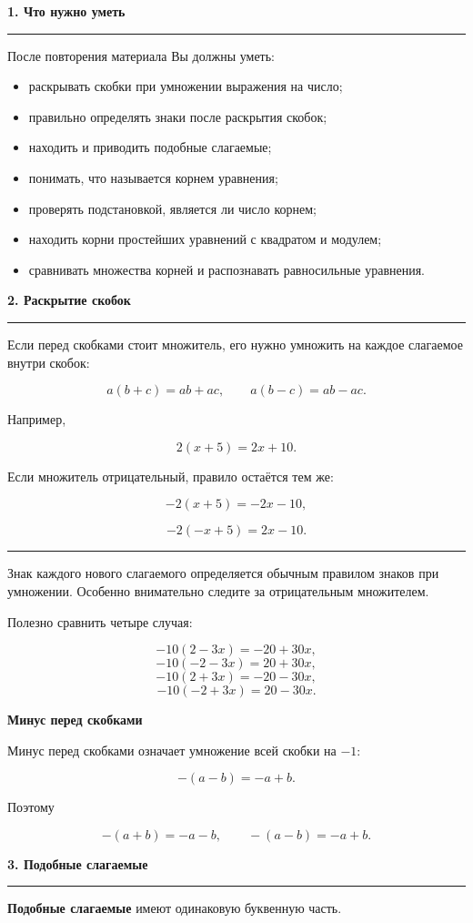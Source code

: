 \documentclass[a4paper,12pt]{article}
\newcommand{\sectiontitle}[1]{%
    \vspace{0.35em}%
    {\Large\bfseries\color{darkaccent}#1\par}%
    \vspace{0.2em}%
    {\color{accent}\rule{\linewidth}{0.7pt}}%
    \vspace{0.6em}%
}
\newcommand{\subsectiontitle}[1]{%
    \vspace{0.55em}%
    {\large\bfseries\color{darkaccent}#1\par}%
    \vspace{0.25em}%
}
\newcommand{\important}[1]{%
    \par\vspace{0.3em}%
    \noindent
    \begin{minipage}{\linewidth}
        {\color{accent}\rule{2.2pt}{\baselineskip}}\hspace{0.6em}%
        \begin{minipage}[t]{0.94\linewidth}
            #1
        \end{minipage}
    \end{minipage}%
    \par\vspace{0.3em}%
}
\begin{document}
\sectiontitle{1. Что нужно уметь}

После повторения материала Вы должны уметь:

\begin{itemize}
    \item раскрывать скобки при умножении выражения на число;
    \item правильно определять знаки после раскрытия скобок;
    \item находить и приводить подобные слагаемые;
    \item понимать, что называется корнем уравнения;
    \item проверять подстановкой, является ли число корнем;
    \item находить корни простейших уравнений с квадратом и модулем;
    \item сравнивать множества корней и распознавать равносильные уравнения.
\end{itemize}

\sectiontitle{2. Раскрытие скобок}

Если перед скобками стоит множитель, его нужно умножить на каждое
слагаемое внутри скобок:

\[
a(b+c)=ab+ac,
\qquad
a(b-c)=ab-ac.
\]

Например,

\[
2(x+5)=2x+10.
\]

Если множитель отрицательный, правило остаётся тем же:

\[
-2(x+5)=-2x-10,
\]

\[
-2(-x+5)=2x-10.
\]

\important{
Знак каждого нового слагаемого определяется обычным правилом знаков
при умножении. Особенно внимательно следите за отрицательным множителем.
}

Полезно сравнить четыре случая:

\[
-10(2-3x)=-20+30x,
\]
\[
-10(-2-3x)=20+30x,
\]
\[
-10(2+3x)=-20-30x,
\]
\[
-10(-2+3x)=20-30x.
\]

\subsectiontitle{Минус перед скобками}

Минус перед скобками означает умножение всей скобки на \(-1\):

\[
-(a-b)=-a+b.
\]

Поэтому

\[
-(a+b)=-a-b,
\qquad
-(a-b)=-a+b.
\]

\sectiontitle{3. Подобные слагаемые}

\textbf{Подобные слагаемые} имеют одинаковую буквенную часть.
\end{document}
